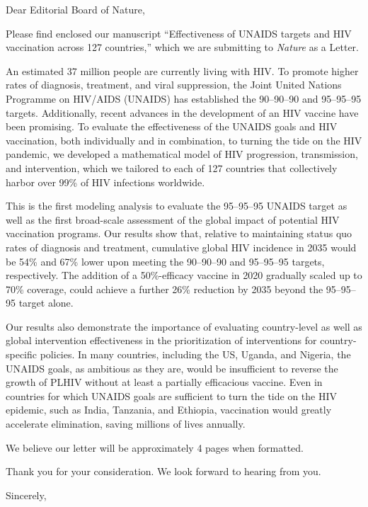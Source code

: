 \documentclass{jpmletter}
\begin{document}
  \begin{letter}{}

    \opening{Dear Editorial Board of Nature,}
 
    Please find enclosed our manuscript ``Effectiveness of UNAIDS
    targets and HIV vaccination across 127 countries,'' which we are
    submitting to \textit{Nature} as a Letter.
 
    An estimated 37 million people are currently living with HIV. To
    promote higher rates of diagnosis, treatment, and viral
    suppression, the Joint United Nations Programme on HIV/AIDS
    (UNAIDS) has established the 90–90–90 and 95–95–95
    targets. Additionally, recent advances in the development of an
    HIV vaccine have been promising. To evaluate the effectiveness of
    the UNAIDS goals and HIV vaccination, both individually and in
    combination, to turning the tide on the HIV pandemic, we developed
    a mathematical model of HIV progression, transmission, and
    intervention, which we tailored to each of 127 countries that
    collectively harbor over 99\% of HIV infections worldwide.

    This is the first modeling analysis to evaluate the 95–95–95
    UNAIDS target as well as the first broad-scale assessment of the
    global impact of potential HIV vaccination programs. Our results
    show that, relative to maintaining status quo rates of diagnosis
    and treatment, cumulative global HIV incidence in 2035 would be
    54\% and 67\% lower upon meeting the 90–90–90 and 95–95–95
    targets, respectively. The addition of a 50\%-efficacy vaccine in
    2020 gradually scaled up to 70\% coverage, could achieve a further
    26\% reduction by 2035 beyond the 95–95–95 target alone.

    Our results also demonstrate the importance of evaluating
    country-level as well as global intervention effectiveness in the
    prioritization of interventions for country-specific policies. In
    many countries, including the US, Uganda, and Nigeria, the UNAIDS
    goals, as ambitious as they are, would be insufficient to reverse
    the growth of PLHIV without at least a partially efficacious
    vaccine. Even in countries for which UNAIDS goals are sufficient
    to turn the tide on the HIV epidemic, such as India, Tanzania, and
    Ethiopia, vaccination would greatly accelerate elimination, saving
    millions of lives annually.
 
    We believe our letter will be approximately 4 pages when
    formatted.

    Thank you for your consideration. We look forward to hearing from
    you.

    \closing{Sincerely,}

  \end{letter}
\end{document}
